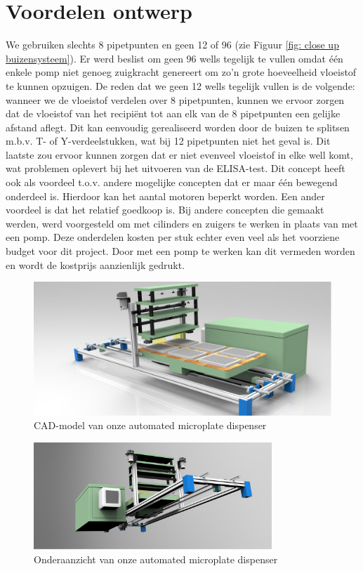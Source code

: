 \documentclass[a4paper,twoside,kulak]{kulakreport} %
\begin{document}
\section{Voordelen ontwerp}
	We gebruiken slechts 8 pipetpunten en geen 12 of 96 (zie Figuur \ref{fig: close up buizensysteem}). Er werd beslist om geen 96 wells tegelijk te vullen omdat één enkele pomp niet genoeg zuigkracht genereert om zo'n grote hoeveelheid vloeistof te kunnen opzuigen. De reden dat we geen 12 wells tegelijk vullen is de volgende: wanneer we de vloeistof verdelen over 8 pipetpunten, kunnen we ervoor zorgen dat de vloeistof van het recipiënt tot aan elk van de 8 pipetpunten een gelijke afstand aflegt. Dit kan eenvoudig gerealiseerd worden door de buizen te splitsen m.b.v. T- of Y-verdeelstukken, wat bij 12 pipetpunten niet het geval is. Dit laatste zou ervoor kunnen zorgen dat er niet evenveel vloeistof in elke well komt, wat problemen oplevert bij het uitvoeren van de ELISA-test. Dit concept heeft ook als voordeel t.o.v. andere mogelijke concepten dat er maar één bewegend onderdeel is. Hierdoor kan het aantal motoren beperkt worden. Een ander voordeel is dat het relatief goedkoop is. Bij andere concepten die gemaakt werden, werd voorgesteld om met cilinders en zuigers te werken in plaats van met een pomp. Deze onderdelen kosten per stuk echter even veel als het voorziene budget voor dit project. Door met een pomp te werken kan dit vermeden worden en wordt de kostprijs aanzienlijk gedrukt. 
	
\begin{figure}[h]
	\centering
	\includegraphics[width=\textwidth]{renderingBovenaan.png}
	\caption{CAD-model van onze automated microplate dispenser}
	\label{fig: CAD-model bovenaan}
	
\end{figure} 

\begin{figure}[h]
	\centering
	\includegraphics[width=0.8\textwidth]{renderingOnderaan.png}
	\caption{Onderaanzicht van onze automated microplate dispenser}
	\label{fig: CAD-model onderaan}
	
\end{figure} 
\end{document}

